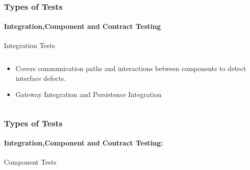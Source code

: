 \documentclass{beamer}
\begin{document}


\begin{frame}
	\frametitle{Types of Tests}	
	\framesubtitle{Integration,Component and Contract Testing }
Integration Tests
\begin{columns}
 \begin{column}{.49\textwidth}
	\begin{itemize}
		\item Covers communication paths and interactions between components to detect interface defects.
		\item Gateway Integration and Persistence Integration
		
	\end{itemize}
\end{column}
\end{columns}
\end{frame}


\begin{frame}
	\frametitle{Types of Tests}	
	\framesubtitle{Integration,Component and Contract Testing: }
Component Tests

\end{frame}
\end{document}
